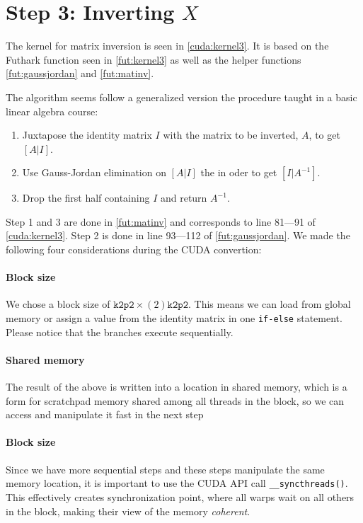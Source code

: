 \section{
    Step 3: Inverting \texorpdfstring{\(X\)}{X}
}

The kernel for matrix inversion is seen in \autoref{cuda:kernel3}. It is based
on the Futhark function seen in \autoref{fut:kernel3} as well as the helper
functions \autoref{fut:gaussjordan} and \autoref{fut:matinv}.

The algorithm seems follow a generalized version the procedure taught in a basic
linear algebra course:

\begin{enumerate}
    \item Juxtapose the identity matrix \(I\) with the matrix to be inverted,
        \(A\), to get \([A|I]\).
    \item Use Gauss-Jordan elimination on \([A|I]\) the in oder to get
        \([I|A^{-1}]\).
    \item Drop the first half containing \(I\) and return \(A^{-1}\).
\end{enumerate}

Step 1 and 3 are done in \autoref{fut:matinv} and corresponds to line 81---91 of
\autoref{cuda:kernel3}. Step 2 is done in line 93---112 of \autoref{fut:gaussjordan}.  
We made the following four considerations during the CUDA convertion:

\paragraph{Block size}
We chose a block size of \(\texttt{k2p2} \times (2)\texttt{k2p2}\). This means
we can load from global memory or assign a value from the identity matrix in one
\texttt{if-else} statement. Please notice that the branches execute
sequentially.

\paragraph{Shared memory}
The result of the above is written into a location in shared memory, which is a
form for scratchpad memory shared among all threads in the block, so we can
access and manipulate it fast in the next step

\paragraph{Block size}
Since we have more sequential steps and these steps manipulate the same memory
location, it is important to use the CUDA API call \texttt{\_\_syncthreads()}.
This effectively creates synchronization point, where all warps wait on all
others in the block, making their view of the memory \textit{coherent}.

